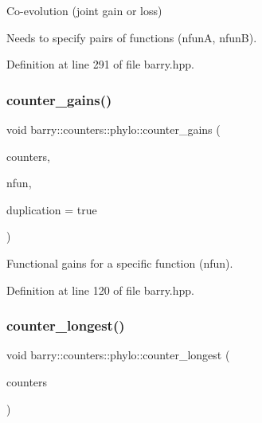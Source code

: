 Co-\/evolution (joint gain or loss) 

Needs to specify pairs of functions ({\ttfamily nfunA}, {\ttfamily nfunB}). 

Definition at line 291 of file barry.\+hpp.

\mbox{\label{namespacebarry_1_1counters_1_1phylo_afc1215e596c2f5a5e3b6f39273427a9a}} 
\subsubsection{\texorpdfstring{counter\+\_\+gains()}{counter\_gains()}}
{\footnotesize\ttfamily void barry\+::counters\+::phylo\+::counter\+\_\+gains (\begin{DoxyParamCaption}\item[{\hyperlink{namespacebarry_1_1counters_1_1phylo_a4e401ffe66d04091343dcffaf915f8c3}{Phylo\+Counters} $\ast$}]{counters,  }\item[{std\+::vector$<$ \hyperlink{namespacebarry_a11dfc53ddb4672278319aa04f1e09a6c}{uint} $>$}]{nfun,  }\item[{bool}]{duplication = {\ttfamily true} }\end{DoxyParamCaption})\hspace{0.3cm}{\ttfamily [inline]}}



Functional gains for a specific function ({\ttfamily nfun}). 



Definition at line 120 of file barry.\+hpp.

\mbox{\label{namespacebarry_1_1counters_1_1phylo_ae4ace7c30011a6d7047a94fd0ddf2df2}} 
\subsubsection{\texorpdfstring{counter\+\_\+longest()}{counter\_longest()}}
{\footnotesize\ttfamily void barry\+::counters\+::phylo\+::counter\+\_\+longest (\begin{DoxyParamCaption}\item[{\hyperlink{namespacebarry_1_1counters_1_1phylo_a4e401ffe66d04091343dcffaf915f8c3}{Phylo\+Counters} $\ast$}]{counters }\end{DoxyParamCaption})\hspace{0.3cm}{\ttfamily [inline]}}



